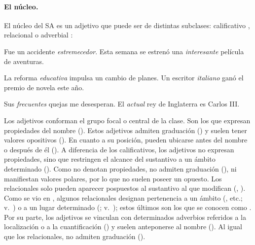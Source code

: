 \paragraph{El núcleo.} El núcleo del SA es un adjetivo que puede ser de
distintas subclases: calificativo , relacional
 o adverbial :

\begin{exe}
  \ex\label{ex:05-calif}
    \begin{xlist}
      \ex Fue un accidente \textit{estremecedor}.
      \ex Esta semana se estrenó una \textit{interesante} película de aventuras.
    \end{xlist}
  \ex\label{ex:05-relac}
    \begin{xlist}
      \ex\label{ex:05-relac-a} La reforma \textit{educativa} impulsa un cambio
          de planes.
      \ex\label{ex:05-relac-b} Un escritor \textit{italiano} ganó el premio de
          novela este año.
    \end{xlist}
  \ex\label{ex:05-adverb}
    \begin{xlist}
      \ex Sus \textit{frecuentes} quejas me desesperan.
      \ex El \textit{actual} rey de Inglaterra es Carlos III.
    \end{xlist}
\end{exe}

Los adjetivos  conforman el grupo focal o central de la
clase. Son los que expresan propiedades del nombre (). Estos adjetivos admiten graduación () y suelen tener valores opositivos ().
En cuanto a su posición, pueden ubicarse antes del nombre o después de él
(). A diferencia de los calificativos, los adjetivos 
no expresan propiedades, sino que restringen el alcance del sustantivo a un
ámbito determinado (). Como no denotan propiedades, no admiten graduación
(), ni manifiestan valores polares,
por lo que no suelen poseer un opuesto. Los relacionales solo pueden aparecer
pospuestos al sustantivo al que modifican (, ). Como se vio en
, algunos relacionales designan pertenencia a un ámbito
(, etc.; v.~)
o a un lugar determinado (;
v.~); estos últimos son los que se conocen como
. Por su parte, los adjetivos  se vinculan con
determinados adverbios referidos a la localización o a la cuantificación
() y suelen
anteponerse al nombre (). Al igual que los relacionales, no admiten graduación
().

